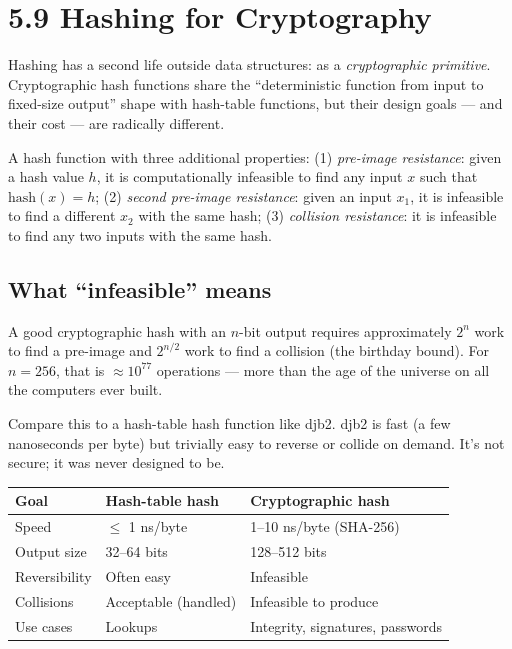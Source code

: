 \documentclass[11pt]{article}
\begin{document}
\section{5.9 Hashing for Cryptography}

Hashing has a second life outside data structures: as a
\emph{cryptographic primitive}. Cryptographic hash functions
share the ``deterministic function from input to fixed-size
output'' shape with hash-table functions, but their design
goals --- and their cost --- are radically different.

\begin{defnbox}
A hash function with three additional properties:
(1) \emph{pre-image resistance}: given a hash value $h$, it is
computationally infeasible to find any input $x$ such that
$\text{hash}(x) = h$;
(2) \emph{second pre-image resistance}: given an input $x_1$, it
is infeasible to find a different $x_2$ with the same hash;
(3) \emph{collision resistance}: it is infeasible to find any
two inputs with the same hash.
\end{defnbox}

\subsection*{What ``infeasible'' means}

A good cryptographic hash with an $n$-bit output requires
approximately $2^n$ work to find a pre-image and $2^{n/2}$ work
to find a collision (the birthday bound). For $n = 256$, that is
$\approx 10^{77}$ operations --- more than the age of the
universe on all the computers ever built.

Compare this to a hash-table hash function like djb2. djb2 is
fast (a few nanoseconds per byte) but trivially easy to reverse
or collide on demand. It's not secure; it was never designed to
be.

\begin{center}
\begin{tabular}{|l|l|l|}
\hline
\textbf{Goal} & \textbf{Hash-table hash} & \textbf{Cryptographic hash} \\
\hline
Speed          & $\leq$ 1 ns/byte    & 1--10 ns/byte (SHA-256) \\
Output size    & 32--64 bits         & 128--512 bits \\
Reversibility  & Often easy           & Infeasible \\
Collisions     & Acceptable (handled) & Infeasible to produce \\
Use cases      & Lookups              & Integrity, signatures, passwords \\
\hline
\end{tabular}
\end{center}
\end{document}
